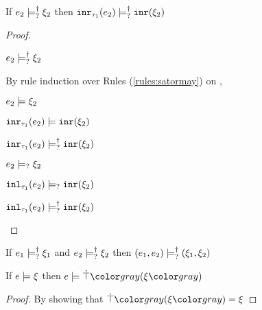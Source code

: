 \begin{lem}
  \label{lem:satormay-inr}
  If $e_2 \models_{?}^{\dag} \xi_2$ then $\mathtt{inr}_{\tau_1}({e_2}) \models_{?}^{\dag} \mathtt{inr}(\xi_2)$
\end{lem}
\begin{proof}
  \begin{pfsteps*}
  \item $e_2 \models_{?}^{\dag} \xi_2$  
  \end{pfsteps*}
  By rule induction over Rules (\ref{rules:satormay}) on ,
  \begin{byCases}

  \item[\text{(\ref{rule:CSMSSat})}]
    \begin{pfsteps*}
    \item $e_2 \models \xi_2$  
    \item $\mathtt{inr}_{\tau_1}({e_2}) \models \mathtt{inr}(\xi_2)$  
    \item $\mathtt{inr}_{\tau_1}({e_2}) \models_{?}^{\dag} \mathtt{inr}(\xi_2)$ 
    \end{pfsteps*}


  \item[\text{(\ref{rule:CSMSMay})}]
    \begin{pfsteps*}
    \item $e_2 \models_{?} \xi_2$  
    \item $\mathtt{inl}_{\tau_1}({e_2}) \models_{?} \mathtt{inr}(\xi_2)$  
    \item $\mathtt{inl}_{\tau_1}({e_2}) \models_{?}^{\dag} \mathtt{inr}(\xi_2)$ 
    \end{pfsteps*}
  \end{byCases}
  \resetpfcounter
\end{proof}

\begin{lem}
  \label{lem:satormay-pair}
  If $e_1 \models_{?}^{\dag} \xi_1$ and $e_2 \models_{?}^{\dag} \xi_2$ then $(e_1 , e_2) \models_{?}^{\dag} (\xi_1 , \xi_2)$
\end{lem}

\begin{lem}
  \label{lem:satisfy-truify}
  If $e \models \xi$ then $\csatisfy{e}{\ctruify{\xi}}$
\end{lem}
\begin{proof}
  By showing that $\ctruify{\xi} = \xi$
\end{proof}

